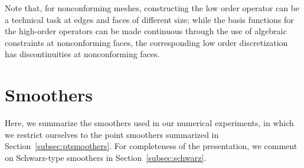 \documentclass[smallcondensed,final]{svjour3}     %
\begin{document}
Note that, for nonconforming meshes, constructing the low order
operator can be a technical task at edges and faces of different size;
while the basis functions for the high-order operators can be made
continuous through the use of algebraic constraints at nonconforming
faces, the corresponding low order discretization has discontinuities
at nonconforming faces.








\section{Smoothers}
Here, we summarize the smoothers used in our numerical experiments, in
which we restrict ourselves to the point smoothers summarized in
Section~\ref{subsec:ptsmoothers}. For completeness of the
presentation, we comment on Schwarz-type smoothers in
Section~\ref{subsec:schwarz}.
\end{document}
